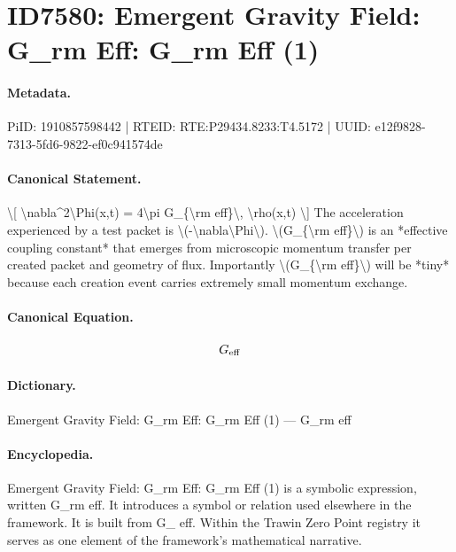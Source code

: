 \section*{ID7580: Emergent Gravity Field: G\_rm Eff: G\_rm Eff (1)}
\paragraph{Metadata.}
PiID: 1910857598442 | RTEID: RTE:P29434.8233:T4.5172 | UUID: e12f9828-7313-5fd6-9822-ef0c941574de

\paragraph{Canonical Statement.}
\textbackslash{}[ \textbackslash{}nabla\textasciicircum{}2\textbackslash{}Phi(x,t) = 4\textbackslash{}pi G\_\{\textbackslash{}rm eff\}\textbackslash{}, \textbackslash{}rho(x,t) \textbackslash{}] The acceleration experienced by a test packet is \textbackslash{}(-\textbackslash{}nabla\textbackslash{}Phi\textbackslash{}). \textbackslash{}(G\_\{\textbackslash{}rm eff\}\textbackslash{}) is an *effective coupling constant* that emerges from microscopic momentum transfer per created packet and geometry of flux. Importantly \textbackslash{}(G\_\{\textbackslash{}rm eff\}\textbackslash{}) will be *tiny* because each creation event carries extremely small momentum exchange.

\paragraph{Canonical Equation.}
\[
G_{\rm eff}
\]

\paragraph{Dictionary.}
Emergent Gravity Field: G\_rm Eff: G\_rm Eff (1) — G\_rm eff

\paragraph{Encyclopedia.}
Emergent Gravity Field: G\_rm Eff: G\_rm Eff (1) is a symbolic expression, written G\_rm eff. It introduces a symbol or relation used elsewhere in the framework. It is built from G\_ eff. Within the Trawin Zero Point registry it serves as one element of the framework's mathematical narrative.
